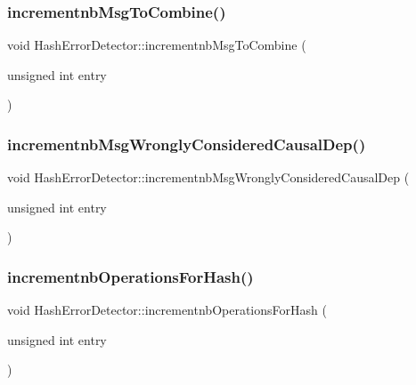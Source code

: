 \subsubsection{\texorpdfstring{incrementnb\+Msg\+To\+Combine()}{incrementnbMsgToCombine()}}
{\footnotesize\ttfamily void Hash\+Error\+Detector\+::incrementnb\+Msg\+To\+Combine (\begin{DoxyParamCaption}\item[{unsigned int}]{entry }\end{DoxyParamCaption})}

\mbox{\label{classHashErrorDetector_a007d537bdfd329c6b23b432b58d4cf4c}} 
\subsubsection{\texorpdfstring{incrementnb\+Msg\+Wrongly\+Considered\+Causal\+Dep()}{incrementnbMsgWronglyConsideredCausalDep()}}
{\footnotesize\ttfamily void Hash\+Error\+Detector\+::incrementnb\+Msg\+Wrongly\+Considered\+Causal\+Dep (\begin{DoxyParamCaption}\item[{unsigned int}]{entry }\end{DoxyParamCaption})}

\mbox{\label{classHashErrorDetector_a6aa56dfbb555e15093bd5d93a683fa42}} 
\subsubsection{\texorpdfstring{incrementnb\+Operations\+For\+Hash()}{incrementnbOperationsForHash()}}
{\footnotesize\ttfamily void Hash\+Error\+Detector\+::incrementnb\+Operations\+For\+Hash (\begin{DoxyParamCaption}\item[{unsigned int}]{entry }\end{DoxyParamCaption})}

